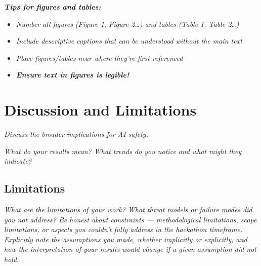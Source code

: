\documentclass[11pt,letterpaper]{article}
\newcommand{\guide}[1]{\textit{#1}}
\begin{document}


\textbf{\textit{Tips for figures and tables:}}
\begin{itemize}
  \item \guide{Number all figures (Figure 1, Figure 2\ldots) and tables
        (Table 1, Table 2\ldots)}
  \item \guide{Include descriptive captions that can be understood without the
        main text}
  \item \guide{Place figures/tables near where they're first referenced}
  \item \textbf{\textit{Ensure text in figures is legible!}}
\end{itemize}

\section{Discussion and Limitations}

\guide{Discuss the broader implications for AI safety.}

\guide{What do your results mean? What trends do you notice and what might they
indicate?}

\subsection*{Limitations}

\guide{What are the limitations of your work? What threat models or failure
modes did you not address? Be honest about constraints --- methodological
limitations, scope limitations, or aspects you couldn't fully address in the
hackathon timeframe. Explicitly note the assumptions you made, whether
implicitly or explicitly, and how the interpretation of your results would
change if a given assumption did not hold.}
\end{document}
